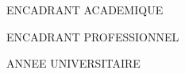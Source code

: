 \begin{titlepage}
\begin{center}
\begin{minipage}[t]{0.45\textwidth}
    \begin{center}
        {\large ENCADRANT ACADEMIQUE}\\[0.4cm]
        {\large \textbf{\encadreurAcad}}
    \end{center}
\end{minipage}
\hfill
\begin{minipage}[t]{0.45\textwidth}
    \begin{center}
        {\large ENCADRANT PROFESSIONNEL}\\[0.4cm]
        {\large \textbf{\encadreurProf}}
    \end{center}
\end{minipage}
\end{center}

\vfill
\begin{center}
    {\large ANNEE UNIVERSITAIRE \anneescolaire}
\end{center}

\end{titlepage}
\cleardoublepage
